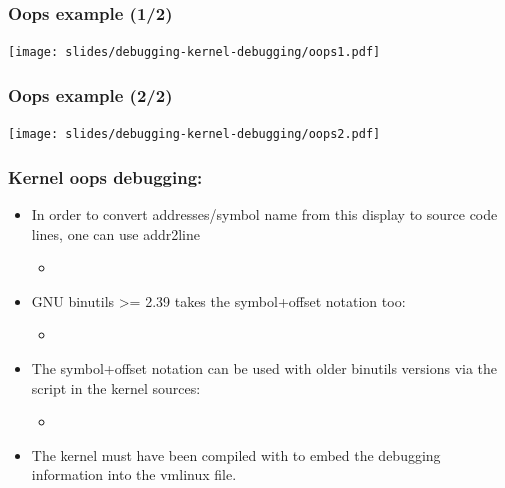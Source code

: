 \begin{frame}
  \frametitle{Oops example (1/2)}
  \begin{center}
    \texttt{[image: slides/debugging-kernel-debugging/oops1.pdf]}
  \end{center}
\end{frame}

\begin{frame}
  \frametitle{Oops example (2/2)}
  \begin{center}
    \texttt{[image: slides/debugging-kernel-debugging/oops2.pdf]}
  \end{center}
\end{frame}

\begin{frame}
  \frametitle{Kernel oops debugging: }
  \begin{itemize}
    \item In order to convert addresses/symbol name from this display to source
      code lines, one can use addr2line
    \begin{itemize}
      \item {}
    \end{itemize}
    \item GNU binutils >= 2.39 takes the symbol+offset notation too:
    \begin{itemize}
      \item {}
    \end{itemize}
    \item The symbol+offset notation can be used with older binutils
      versions via the  script in the kernel sources:
    \begin{itemize}
      \item {}
    \end{itemize}
    \item The kernel must have been compiled with
       to embed the debugging information into
      the vmlinux file.
  \end{itemize}
\end{frame}

